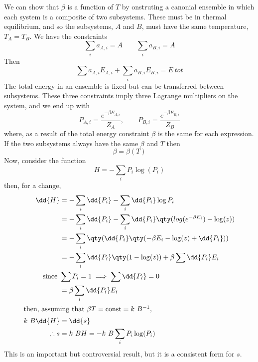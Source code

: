 We can show that $\beta$ is a function of $T$ by onstruting a canonial
ensemble in which each system is a composite of two subsystems. These
must be in thermal equilibrium, and so the subsystems, $A$ and $B$,
must have the same temperature, $T_A = T_B$. We have the constraints 
\[ \sum_i a_{A,i} = A \qquad \sum_i a_{B,i} = A \]
Then
\[\sum a_{A,i} E_{A,i} + \sum_i a_{B,i} E_{B,i} = E~{tot} \]
The total energy in an ensemble is fixed but can be transferred
between subsystems. These three constraints imply three Lagrange
multipliers on the system, and we end up with
\[ P_{A,i} = \frac{e^{-\beta E_{A,i}}}{Z_A}, \qquad P_{B,i} =
\frac{e^{-\beta E_{B,i}}}{Z_B} \] where, as a result of the total
energy constraint $\beta$ is the same for each expression. If the two
subsystems always have the same $\beta$ and $T$ then 
\[ \beta = \beta(T) \]
Now, consider the function
\begin{equation}
  \label{eq:15}
  H = - \sum_i P_i \log(P_i)
\end{equation}
then, for a change,
\begin{align*}
  \dd{H} &= - \sum_i \dd{P_i} - \sum_i \dd{P_i} \log{P_i} \\
  &= - \sum_i \dd{P_i} -\sum_i \dd{P_i} \qty( log(e^{-\beta E_i}) - \log(z) ) \\
  &= - \sum_i \qty( \dd{P_i} \qty( - \beta E_i - \log(z) + \dd{P_i} )) \\
  &= - \sum_i \dd{P_i} \qty( 1 - \log(z) ) + \beta \sum \dd{P_i} E_i \\
  \text{since } & \sum P_i = 1 \implies \sum \dd{P_i} =0 \\
  &= \beta \sum_i \dd{P_i} E_i \\
  \shortintertext{then, assuming that $\beta T = \text{const} = k~B^{-1}$,}
  k~B \dd{H} &= \dd{s} \\
\therefore s &= k~B H = -k~B \sum_i P_i \log(P_i)
\end{align*}
This is an important but controversial result, but it is a consistent
form for $s$.

